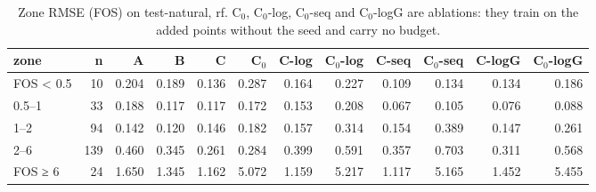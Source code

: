 \begin{table}[htbp]
\centering
\small
\setlength{\tabcolsep}{4pt}
\caption{Zone RMSE (FOS) on test-natural, rf. C$_0$, C$_0$-log, C$_0$-seq and C$_0$-logG are ablations: they train on the added points without the seed and carry no budget.}
\label{tab:test-natural__log-rmse:zones:rf}
\begin{tabular}{lrrrrrrrrrrr}
\toprule
zone & n & A & B & C & C$_0$ & C-log & C$_0$-log & C-seq & C$_0$-seq & C-logG & C$_0$-logG \\
\midrule
FOS < 0.5 & 10 & 0.204 & 0.189 & 0.136 & 0.287 & 0.164 & 0.227 & 0.109 & 0.134 & 0.134 & 0.186 \\
0.5–1 & 33 & 0.188 & 0.117 & 0.117 & 0.172 & 0.153 & 0.208 & 0.067 & 0.105 & 0.076 & 0.088 \\
1–2 & 94 & 0.142 & 0.120 & 0.146 & 0.182 & 0.157 & 0.314 & 0.154 & 0.389 & 0.147 & 0.261 \\
2–6 & 139 & 0.460 & 0.345 & 0.261 & 0.284 & 0.399 & 0.591 & 0.357 & 0.703 & 0.311 & 0.568 \\
FOS ≥ 6 & 24 & 1.650 & 1.345 & 1.162 & 5.072 & 1.159 & 5.217 & 1.117 & 5.165 & 1.452 & 5.455 \\
\bottomrule
\end{tabular}
\end{table}
